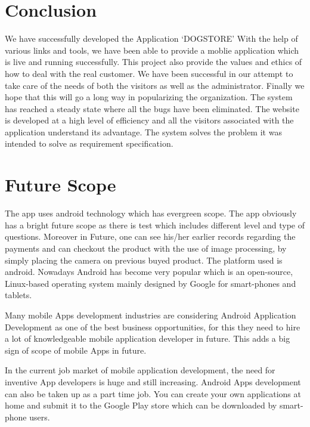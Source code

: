 \section{Conclusion}
We have successfully developed the Application ‘DOGSTORE’ With the help of various links and tools, we have been able to provide a moblie application which is live and running successfully. This project also provide the values and ethics of how to deal with the real customer. We have been successful in our attempt to take care of the needs of both the visitors as well as the administrator. Finally we hope that this will go a long way in popularizing the organization. The system has reached a steady state where all the bugs have been eliminated. The website is developed at a high level of efficiency and all the visitors associated with the application understand its advantage. The system solves the problem it was intended to solve as requirement specification.

 
\section{Future Scope}
The app uses android technology which has evergreen scope. The app obviously
has a bright future scope as there is test which includes different level and type of
questions. Moreover in Future, one can see his/her earlier records regarding the
payments and can checkout the product with the use of image processing, by simply placing the camera on previous buyed product. The platform used is android. Nowadays Android has
become very popular which is an open-source, Linux-based operating system
mainly designed by Google for smart-phones and tablets.

Many mobile Apps development industries are considering Android Application
Development as one of the best business opportunities, for this they need to
hire a lot of knowledgeable mobile application developer in future. This adds a
big sign of scope of mobile Apps in future.

In the current job market of mobile application development, the need for inventive
App developers is huge and still increasing. Android Apps development can also
be taken up as a part time job. You can create your own applications at home and
submit it to the Google Play store which can be downloaded by smart-phone users.